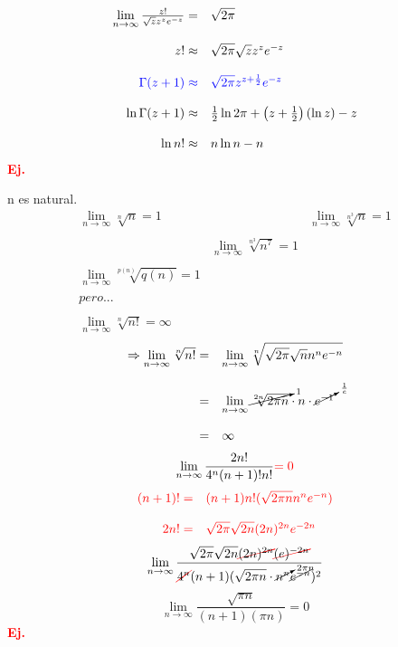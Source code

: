\documentclass{article}
\theoremstyle{definition}
\begin{document}
\[
\begin{array}{rl}
	\lim\limits_{n\to \infty}\frac{z!}{\sqrt{z}z^ze^{-z}}=& \sqrt{2\pi}\\
	\\
	z!\approx &\sqrt{2\pi}\sqrt{z}z^ze^{-z}\\
	\\
	\textcolor{blue}{\Gamma (z+1)\approx} & \textcolor{blue}{\sqrt{2\pi} z^{z+\frac{1}{2}}e^{-z}}\\
	\\
	\ln \Gamma (z+1) \approx & \frac{1}{2} \ln 2\pi +\left( z+\frac{1}{2}\right)(\ln z)-z\\
	\\
	\ln n! \approx & n\ln n - n 
\end{array}
\]
\textbf{\textcolor{red}{Ej.}}

n es natural.
\[
\begin{array}{lcr}
	\lim\limits_{n\to \infty} \sqrt[n]{n}=1 && \lim\limits_{n\to \infty} \sqrt[n^3]{n}=1\\
	\\
	&\lim\limits_{n\to \infty} \sqrt[n^3]{n^7}=1\\
	\\
	\lim\limits_{n\to \infty} \sqrt[p(n)]{q(n)}=1\\
	\\
	\textit{pero...}\\
	\\
	\lim\limits_{n\to \infty} \sqrt[n]{n!}=\infty
\end{array}
\]
\[
\begin{array}{rl}
	\Rightarrow \lim\limits_{n\to \infty} \sqrt[n]{n!}=& \lim\limits_{n\to \infty}\sqrt[n]{\sqrt{2\pi}\sqrt{n}n^ne^{-n}}\\
	\\
	=& \lim\limits_{n\to \infty} \cancelto{1}{\sqrt[2n]{2\pi n}}\cdot n\cdot \cancelto{\frac{1}{e}}{e^{-1}}\\
	\\
	=& \infty
\end{array}
\]
\[\lim\limits_{n\to \infty} \frac{2n!}{4^n(n+1)!n!}\textcolor{red}{=0}\]
\[\textcolor{red}{
\begin{array}{rl}
	(n+1)!=& (n+1)n!(\sqrt{2\pi n } n^n e^{-n})\\
	\\
	2n!=& \sqrt{2\pi}\sqrt{2n}(2n)^{2n}e^{-2n}
\end{array}
}\]
\[\lim\limits_{n\to \infty}\frac{\sqrt{2\pi} \sqrt{2n}\textcolor{red}{\cancel{\textcolor{black}{(2n)^{2n}}}\cancel{\textcolor{black}{(e)^{-2n}}}}}{\textcolor{red}{\cancel{\textcolor{black}{4^n}}}(n+1)(\sqrt{2\pi n}\cdot \cancelto{2\pi n}{n^n}\cancel{e^{-n}})^2}\]
\[\lim\limits_{n\to \infty} \frac{\sqrt{\pi n}}{(n+1)(\pi n)}=0\]
\textbf{\textcolor{red}{Ej.}}
\end{document}
